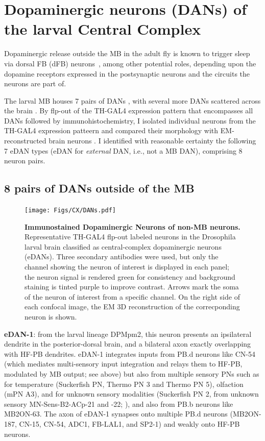  \section{Dopaminergic neurons (DANs) of the larval Central Complex}
\label{CXDANs}
    Dopaminergic release outside the MB in the adult fly is known to trigger sleep via dorsal FB (dFB) neurons~\citep{pimentel2016sleep}, among other potential roles, depending upon the dopamine receptors expressed in the postsynaptic neurons and the circuits the neurons are part of. 

    The larval MB houses 7 pairs of DANs \citep{eichler2017complete}, with several more DANs scattered across the brain \citep{selcho2009thgal4}. By flp-out of the TH-GAL4 expression pattern that encompasses all DANs \citep{selcho2009thgal4} followed by immunohistochemistry, I isolated individual neurons from the TH-GAL4 expression patteern and compared their morphology with EM-reconstructed brain neurons \citep{winding2023connectome}. I identified with reasonable certainty the following 7 eDAN types (eDAN for \textit{external} DAN, i.e., not a MB DAN), comprising 8 neuron pairs.

    \subsection{8 pairs of DANs outside of the MB}

    \begin{figure}
        \centering
        \texttt{[image: Figs/CX/DANs.pdf]}
        \caption{\textbf{Immunostained Dopaminergic Neurons of non-MB neurons.}  Representative TH-GAL4 flp-out labeled neurons in the Drosophila larval brain classified as central-complex dopaminergic neurons (eDANs). Three secondary antibodies were used, but only the channel showing the neuron of interest is displayed in each panel; the neuron signal is rendered green for consistency and background staining is tinted purple to improve contrast. Arrows mark the soma of the neuron of interest from a specific channel. On the right side of each confocal image,  the EM 3D reconstruction of the correcponding neuron is shown.  }
        \label{DANs}
    \end{figure}
    


    \textbf{eDAN-1}: from the larval lineage DPMpm2, this neuron presents an ipsilateral dendrite in the posterior-dorsal brain, and a bilateral axon exactly overlapping with HF-PB dendrites. eDAN-1 integrates inputs from PB.d neurons like CN-54 (which mediates multi-sensory input integration and relays them to HF-PB, modulated by MB output; see above) but also from multiple sensory PNs such as for temperature (Suckerfish PN, Thermo PN 3 and Thermo PN 5), olfaction (mPN A3), and for unknown sensory modalities (Suckerfish PN 2, from unknown sensory MN-Sens-B2-ACp-21 and -22; \citep{miroschnikow2018convergence}), and also from PB.b neurons like MB2ON-63. The axon of eDAN-1 synapses onto multiple PB.d neurons (MB2ON-187, CN-15, CN-54, ADC1, FB-LAL1, and SP2-1) and weakly onto HF-PB neurons.

